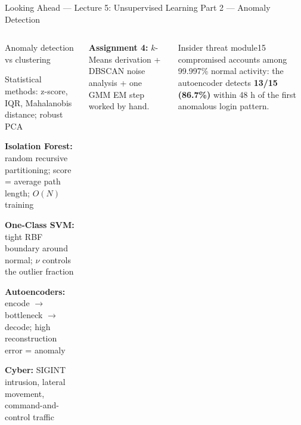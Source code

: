\documentclass[aspectratio=169,10pt,t]{beamer}
\begin{document}
\begin{frame}{Looking Ahead --- Lecture 5: Unsupervised Learning Part 2 --- Anomaly Detection}
\begin{columns}[T]
\begin{tl}\item Anomaly detection vs clustering\item Statistical methods: z-score, IQR, Mahalanobis distance; robust PCA\item \textbf{Isolation Forest:} random recursive partitioning; score = average path length; $O(N)$ training\item \textbf{One-Class SVM:} tight RBF boundary around normal; $\nu$ controls the outlier fraction\item \textbf{Autoencoders:} encode $\to$ bottleneck $\to$ decode; high reconstruction error = anomaly\item \textbf{Cyber:} SIGINT intrusion, lateral movement, command-and-control traffic\end{tl}
\begin{ibox}\scriptsize\textbf{Assignment 4:} $k$-Means derivation + DBSCAN noise analysis + one GMM EM step worked by hand.\end{ibox}
\begin{cbox}[ISSAnavy]{Insider threat module}\scriptsize 15 compromised accounts among 99.997\% normal activity: the autoencoder detects \textbf{13/15 (86.7\%)} within 48 h of the first anomalous login pattern.\end{cbox}
\end{columns}
\end{frame}
\end{document}
